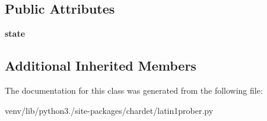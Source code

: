 \subsection*{Public Attributes}
\begin{DoxyCompactItemize}
\item 
\mbox{\label{classchardet_1_1latin1prober_1_1_latin1_prober_aa6935b6679cf864b52dbcae2fb51ade0}} 
{\bfseries state}
\end{DoxyCompactItemize}
\subsection*{Additional Inherited Members}


The documentation for this class was generated from the following file\+:\begin{DoxyCompactItemize}
\item 
venv/lib/python3./site-\/packages/chardet/latin1prober.\+py\end{DoxyCompactItemize}
